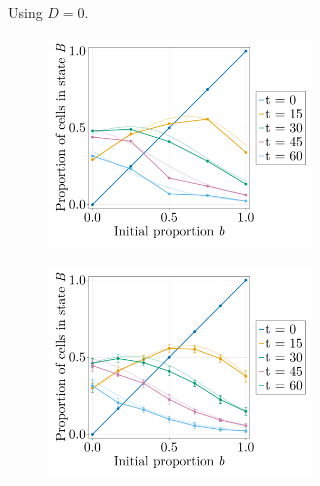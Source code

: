\begin{figure}[p]
\begin{subfigure}{\textwidth}
\begin{subfigure}{0.47\textwidth}
        \end{subfigure}
        \caption{Using $D=0$.}
    \end{subfigure}
    \vspace{0.5em}
    \begin{subfigure}{\textwidth}
        \centering
        \begin{subfigure}{0.47\textwidth}
            \centering
            \includegraphics[width=\textwidth]{figures/407/407-phib-vs-b-simulation-1ite-fp10-vs-meanfield.png}
        \end{subfigure}
        \hfill
        \begin{subfigure}{0.47\textwidth}
            \centering
            \includegraphics[width=\textwidth]{figures/408/408-phib-vs-b-simulation-10ite-fp10-cellcell-vs-meanfield.png}

\end{subfigure}
\end{subfigure}
\end{figure}
